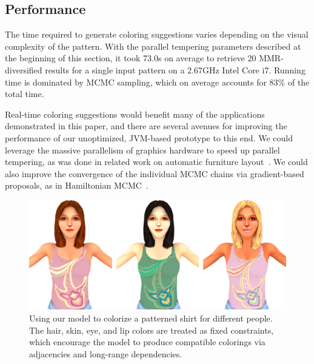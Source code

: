 \subsection{Performance}

The time required to generate coloring suggestions varies depending on the visual complexity of the pattern. With the parallel tempering parameters described at the beginning of this section, it took 73.0s on average to retrieve 20 MMR-diversified results for a single input pattern on a 2.67GHz Intel Core i7. Running time is dominated by MCMC sampling, which on average accounts for 83\% of the total time.

Real-time coloring suggestions would benefit many of the applications demonstrated in this paper, and there are several avenues for improving the performance of our unoptimized, JVM-based prototype to this end. We could leverage the massive parallelism of graphics hardware to speed up parallel tempering, as was done in related work on automatic furniture layout~\cite{MerrellFurnitureLayout}. We could also improve the convergence of the individual MCMC chains via gradient-based proposals, as in Hamiltonian MCMC~\cite{HamiltonianMCMC}.

\begin{figure}[ht]
\centering
\includegraphics[width=\columnwidth]{figs/fashion/composite}
\caption{Using our model to colorize a patterned shirt for different people. The hair, skin, eye, and lip colors are treated as fixed constraints, which encourage the model to produce compatible colorings via adjacencies and long-range dependencies.}
\label{fig:fashion}
\vspace{-1.0em}
\end{figure}

